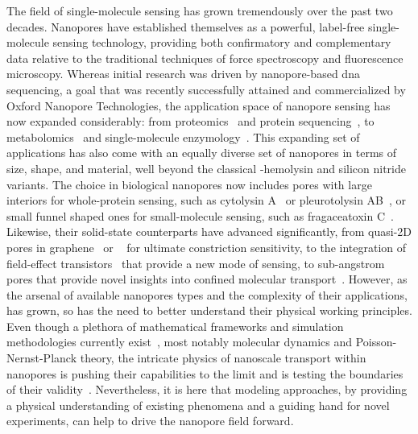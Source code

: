 The field of single-molecule sensing has grown tremendously over the past two decades. Nanopores have
established themselves as a powerful, label-free single-molecule sensing technology, providing both
confirmatory and complementary data relative to the traditional techniques of force spectroscopy and
fluorescence microscopy. Whereas initial research was driven by nanopore-based \gls{dna} sequencing, a goal
that was recently successfully attained and commercialized by Oxford Nanopore Technologies, the application
space of nanopore sensing has now expanded considerably: from proteomics~\cite{Yusko-2017,Houghtaling-2019}
and protein sequencing~\cite{Restrepo-Perez-2018}, to metabolomics~\cite{Zernia-2020} and single-molecule
enzymology~\cite{Galenkamp-2020,Willems-VanMeervelt-2017}. This expanding set of applications has also come
with an equally diverse set of nanopores in terms of size, shape, and material, well beyond the classical
\ta-hemolysin and silicon nitride variants. The choice in biological nanopores now includes pores with large
interiors for whole-protein sensing, such as cytolysin A~\cite{Soskine-2012} or pleurotolysin
AB~\cite{Huang-2020}, or small funnel shaped ones for small-molecule sensing, such as fragaceatoxin
C~\cite{Huang-2017,Restrepo-Perez-2019a}. Likewise, their solid-state counterparts have advanced
significantly, from quasi-2D pores in graphene~\cite{Fischbein-2008} or ~\cite{Feng-2015b} for
ultimate constriction sensitivity, to the integration of field-effect transistors~\cite{Ren-2020} that provide
a new mode of sensing, to sub-angstrom pores that provide novel insights into confined molecular
transport~\cite{Rigo-2019}. However, as the arsenal of available nanopores types and the complexity of their
applications, has grown, so has the need to better understand their physical working principles. Even though a
plethora of mathematical frameworks and simulation methodologies currently exist~\cite{Maffeo-2012}, most
notably molecular dynamics and Poisson-Nernst-Planck theory, the intricate physics of nanoscale transport
within nanopores is pushing their capabilities to the limit and is testing the boundaries of their
validity~\cite{Collins-2012}. Nevertheless, it is here that modeling approaches, by providing a physical
understanding of existing phenomena and a guiding hand for novel experiments, can help to drive the nanopore
field forward.


\cleardoublepage

